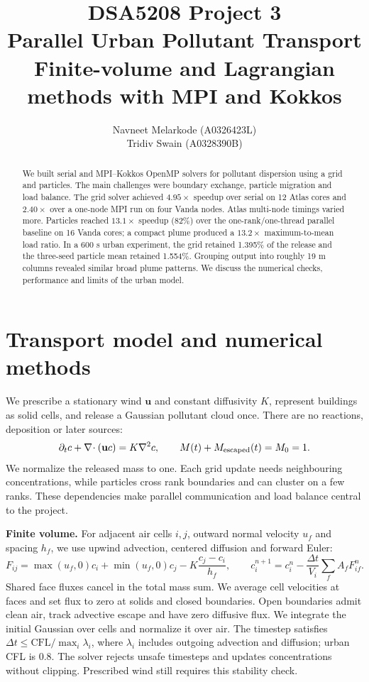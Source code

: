 \documentclass[11pt,a4paper]{article}
\title{DSA5208 Project 3\\Parallel Urban Pollutant Transport\\\large Finite-volume and Lagrangian methods with MPI and Kokkos}
\author{Navneet Melarkode (A0326423L)\\Tridiv Swain (A0328390B)}
\date{}
\begin{document}
\maketitle
\vspace{-7mm}
\begin{abstract}
We built serial and MPI--Kokkos OpenMP solvers for pollutant dispersion using a grid and particles. The main challenges were boundary exchange, particle migration and load balance. The grid solver achieved $4.95\times$ speedup over serial on 12 Atlas cores and $2.40\times$ over a one-node MPI run on four Vanda nodes. Atlas multi-node timings varied more. Particles reached $13.1\times$ speedup (82\%) over the one-rank/one-thread parallel baseline on 16 Vanda cores; a compact plume produced a $13.2\times$ maximum-to-mean load ratio. In a 600 s urban experiment, the grid retained 1.395\% of the release and the three-seed particle mean retained 1.554\%. Grouping output into roughly 19 m columns revealed similar broad plume patterns. We discuss the numerical checks, performance and limits of the urban model.
\end{abstract}

\section{Transport model and numerical methods}
We prescribe a stationary wind $\mathbf u$ and constant diffusivity $K$, represent buildings as solid cells, and release a Gaussian pollutant cloud once. There are no reactions, deposition or later sources:
\begin{equation}
\partial_t c+\nabla\!\cdot(\mathbf u c)=K\nabla^2c,
\qquad M(t)+M_{\rm escaped}(t)=M_0=1.
\end{equation}
We normalize the released mass to one. Each grid update needs neighbouring concentrations, while particles cross rank boundaries and can cluster on a few ranks. These dependencies make parallel communication and load balance central to the project.

\textbf{Finite volume.} For adjacent air cells $i,j$, outward normal velocity $u_f$ and spacing $h_f$, we use upwind advection, centered diffusion and forward Euler:
\begin{equation}
F_{ij}=\max(u_f,0)c_i+\min(u_f,0)c_j-K\frac{c_j-c_i}{h_f},\qquad
c_i^{n+1}=c_i^n-\frac{\Delta t}{V_i}\sum_f A_fF_{if}^n.
\end{equation}
Shared face fluxes cancel in the total mass sum. We average cell velocities at faces and set flux to zero at solids and closed boundaries. Open boundaries admit clean air, track advective escape and have zero diffusive flux. We integrate the initial Gaussian over cells and normalize it over air. The timestep satisfies $\Delta t\leq\mathrm{CFL}/\max_i\lambda_i$, where $\lambda_i$ includes outgoing advection and diffusion; urban CFL is 0.8. The solver rejects unsafe timesteps and updates concentrations without clipping. Prescribed wind still requires this stability check.
\end{document}
